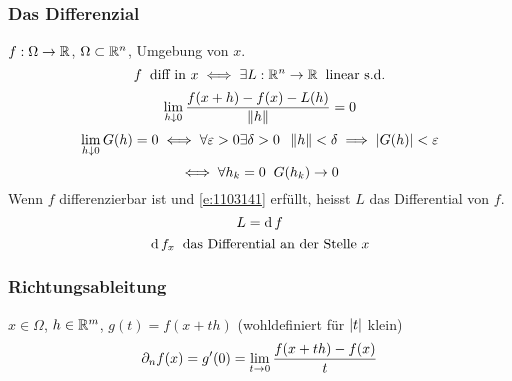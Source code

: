 \subsubsection{Das Differenzial}
$f:\Omega\rightarrow\mathbb{R}$, $\Omega\subset\mathbb{R}^n$, Umgebung von $x$.
\[f\hspace{2mm}\text{diff in $x$}\iff \exists L:\mathbb{R}^n\rightarrow\mathbb{R}\hspace{2mm}\text{linear s.d.}\]
\begin{equation}
  \label{e:1103141}
  \lim_{h\downarrow 0}\frac{f(x+h)-f(x)-L(h)}{\left\| h \right\|}=0
\end{equation}
\[\lim_{h\downarrow 0}G(h)=0\iff \forall \varepsilon>0\exists \delta>0\hspace{2mm}\left\| h \right\|<\delta\implies\left| G(h) \right|<\varepsilon\]
\[\iff \forall h_k=0\hspace{2mm} G(h_k)\rightarrow 0\]
Wenn $f$ differenzierbar ist und \ref{e:1103141} erfüllt, heisst $L$ das Differential von $f$.
\[L=\operatorname{d} f\]
\[\operatorname{d} f_x \hspace{2mm} \text{das Differential an der Stelle $x$}\]
\subsubsection{Richtungsableitung}
$x\in\Omega$, $h\in\mathbb{R}^m$, $g(t)=f(x+th)$ (wohldefiniert für $\left| t \right|$ klein)
\[\partial_n f(x)=g'(0)=\displaystyle\lim_{t\rightarrow0}\frac{f(x+th)-f(x)}{t}\]
